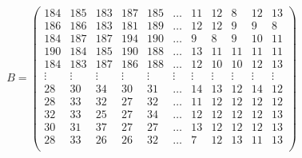 \documentclass[varwidth]{standalone}
\begin{document}
\[
B = \begin{pmatrix}
184 & 185 & 183 & 187 & 185 & \dots & 11 & 12 & 8 & 12 & 13 \\
186 & 186 & 183 & 181 & 189 & \dots & 12 & 12 & 9 & 9 & 8 \\
184 & 187 & 187 & 194 & 190 & \dots & 9 & 8 & 9 & 10 & 11 \\
190 & 184 & 185 & 190 & 188 & \dots & 13 & 11 & 11 & 11 & 11 \\
184 & 183 & 187 & 186 & 188 & \dots & 12 & 10 & 10 & 12 & 13 \\
\vdots & \vdots & \vdots & \vdots & \vdots & \vdots & \vdots & \vdots & \vdots & \vdots & \vdots \\
28 & 30 & 34 & 30 & 31 & \dots & 14 & 13 & 12 & 14 & 12 \\
28 & 33 & 32 & 27 & 32 & \dots & 11 & 12 & 12 & 12 & 12 \\
32 & 33 & 25 & 27 & 34 & \dots & 12 & 12 & 12 & 12 & 13 \\
30 & 31 & 37 & 27 & 27 & \dots & 13 & 12 & 12 & 12 & 13 \\
28 & 33 & 26 & 26 & 32 & \dots & 7 & 12 & 13 & 11 & 13 \\
\end{pmatrix}
\]
\end{document}
